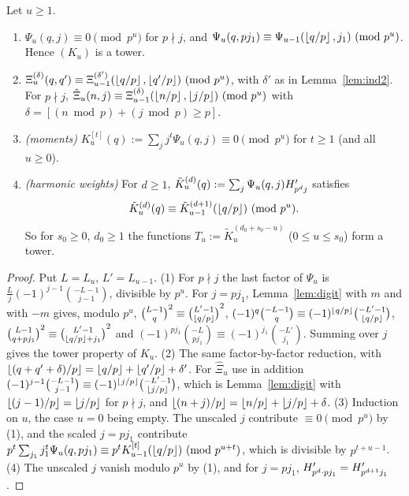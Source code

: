 \documentclass[11pt]{amsart}
\begin{document}
\begin{lemma}[towers]\label{lem:towers}
Let $u\ge1$.
\begin{enumerate}
\item $\Psi_u(q,j)\equiv0\pmod{p^u}$ for $p\nmid j$, and $\Psi_u(q,pj_1)\equiv\Psi_{u-1}(\left\lfloor q/p\right\rfloor,j_1)\ (\mathrm{mod}\ p^u)$. Hence $(K_u)$ is a tower.
\item $\Xi^{(\delta)}_u(q,q')\equiv\Xi^{(\delta')}_{u-1}(\left\lfloor q/p\right\rfloor,\left\lfloor q'/p\right\rfloor)\ (\mathrm{mod}\ p^u)$, with $\delta'$ as in Lemma~\ref{lem:ind2}. For $p\nmid j$, $\hat\Xi_u(n,j)\equiv\Xi^{(\delta)}_{u-1}(\left\lfloor n/p\right\rfloor,\left\lfloor j/p\right\rfloor)\ (\mathrm{mod}\ p^u)$ with $\delta=[(n\bmod p)+(j\bmod p)\ge p]$.
\item \emph{(moments)} $K^{[t]}_u(q):=\sum_jj^t\Psi_u(q,j)\equiv0\pmod{p^u}$ for $t\ge1$ (and all $u\ge0$).
\item \emph{(harmonic weights)} For $d\ge1$, $\tilde K^{(d)}_u(q):=\sum_j\Psi_u(q,j)H'_{p^dj}$ satisfies
\[ \tilde K^{(d)}_u(q)\equiv\tilde K^{(d+1)}_{u-1}(\left\lfloor q/p\right\rfloor)\ (\mathrm{mod}\ p^u). \] So for $s_0\ge0$, $d_0\ge1$ the functions $T_u:=\tilde K^{(d_0+s_0-u)}_u$ ($0\le u\le s_0$) form a tower.
\end{enumerate}
\end{lemma}
\begin{proof}
Put $L=L_u$, $L'=L_{u-1}$. (1) For $p\nmid j$ the last factor of $\Psi_u$ is $\frac Lj(-1)^{j-1}\binom{-L-1}{j-1}$, divisible by $p^u$. For $j=pj_1$, Lemma~\ref{lem:digit} with $m$ and with $-m$ gives, modulo $p^u$, $\binom{L-1}q^2\equiv\binom{L'-1}{\left\lfloor q/p\right\rfloor}^2$, $(-1)^q\binom{-L-1}q\equiv(-1)^{\left\lfloor q/p\right\rfloor}\binom{-L'-1}{\left\lfloor q/p\right\rfloor}$, $\binom{L-1}{q+pj_1}^2\equiv\binom{L'-1}{\left\lfloor q/p\right\rfloor+j_1}^2$ and $(-1)^{pj_1}\binom{-L}{pj_1}\equiv(-1)^{j_1}\binom{-L'}{j_1}$. Summing over $j$ gives the tower property of $K_u$. (2) The same factor-by-factor reduction, with $\left\lfloor (q+q'+\delta)/p\right\rfloor=\left\lfloor q/p\right\rfloor+\left\lfloor q'/p\right\rfloor+\delta'$. For $\hat\Xi_u$ use in addition $(-1)^{j-1}\binom{-L-1}{j-1}\equiv(-1)^{\left\lfloor j/p\right\rfloor}\binom{-L'-1}{\left\lfloor j/p\right\rfloor}$, which is Lemma~\ref{lem:digit} with $\left\lfloor (j-1)/p\right\rfloor=\left\lfloor j/p\right\rfloor$ for $p\nmid j$, and $\left\lfloor (n+j)/p\right\rfloor=\left\lfloor n/p\right\rfloor+\left\lfloor j/p\right\rfloor+\delta$. (3) Induction on $u$, the case $u=0$ being empty. The unscaled $j$ contribute $\equiv0\pmod{p^u}$ by (1), and the scaled $j=pj_1$ contribute $p^t\sum_{j_1}j_1^t\Psi_u(q,pj_1)\equiv p^tK^{[t]}_{u-1}(\left\lfloor q/p\right\rfloor)\ (\mathrm{mod}\ p^{u+t})$, which is divisible by $p^{t+u-1}$. (4) The unscaled $j$ vanish modulo $p^u$ by (1), and for $j=pj_1$, $H'_{p^d\cdot pj_1}=H'_{p^{d+1}j_1}$.
\end{proof}
\end{document}
